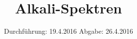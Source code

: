 

\subject{V605}
\title{Alkali-Spektren}
\date{
  Durchführung: 19.4.2016
  \hspace{3em}
  Abgabe: 26.4.2016
}



\maketitle
\thispagestyle{empty}
\tableofcontents
\newpage








\printbibliography


